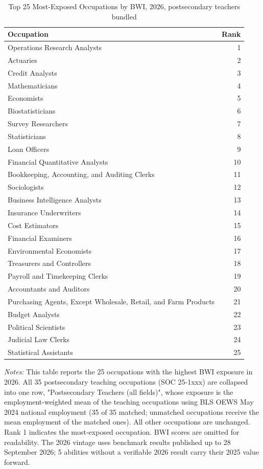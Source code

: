 \begin{table}[htbp]\centering
\caption{Top 25 Most-Exposed Occupations by BWI, 2026, postsecondary teachers bundled}\label{tab:table_top25_teachers_bundled}
\begin{tabular}{lr}\toprule
Occupation & Rank \\ \midrule
Operations Research Analysts & 1 \\
Actuaries & 2 \\
Credit Analysts & 3 \\
Mathematicians & 4 \\
Economists & 5 \\
Biostatisticians & 6 \\
Survey Researchers & 7 \\
Statisticians & 8 \\
Loan Officers & 9 \\
Financial Quantitative Analysts & 10 \\
Bookkeeping, Accounting, and Auditing Clerks & 11 \\
Sociologists & 12 \\
Business Intelligence Analysts & 13 \\
Insurance Underwriters & 14 \\
Cost Estimators & 15 \\
Financial Examiners & 16 \\
Environmental Economists & 17 \\
Treasurers and Controllers & 18 \\
Payroll and Timekeeping Clerks & 19 \\
Accountants and Auditors & 20 \\
Purchasing Agents, Except Wholesale, Retail, and Farm Products & 21 \\
Budget Analysts & 22 \\
Political Scientists & 23 \\
Judicial Law Clerks & 24 \\
Statistical Assistants & 25 \\
\bottomrule\end{tabular}
\begin{minipage}{0.95\linewidth}\footnotesize \textit{Notes:} This table reports the 25 occupations with the highest BWI exposure in 2026. All 35 postsecondary teaching occupations (SOC 25-1xxx) are collapsed into one row, "Postsecondary Teachers (all fields)", whose exposure is the employment-weighted mean of the teaching occupations using BLS OEWS May 2024 national employment (35 of 35 matched; unmatched occupations receive the mean employment of the matched ones). All other occupations are unchanged. Rank 1 indicates the most-exposed occupation. BWI scores are omitted for readability. The 2026 vintage uses benchmark results published up to 28 September 2026; 5 abilities without a verifiable 2026 result carry their 2025 value forward.\end{minipage}
\end{table}
